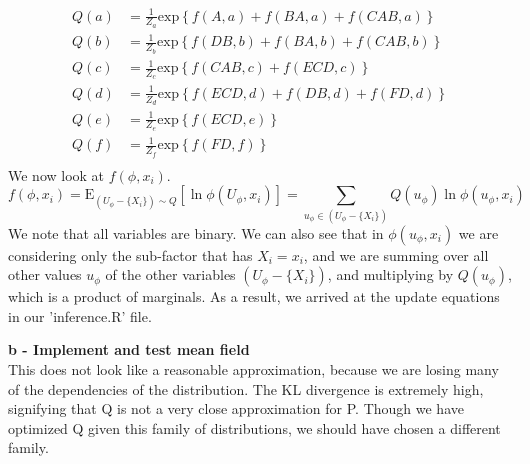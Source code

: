\documentclass[12pt]{article}
\begin{document}
\begin{align*}
Q(a) &= \frac{1}{Z_a} \mathrm{exp} \left\lbrace f(A,a) + f(BA,a) + f(CAB,a) \right\rbrace \\
Q(b) &= \frac{1}{Z_b} \mathrm{exp} \left\lbrace f(DB,b) + f(BA,b) + f(CAB,b) \right\rbrace \\
Q(c) &= \frac{1}{Z_c} \mathrm{exp} \left\lbrace f(CAB,c) + f(ECD,c) \right\rbrace \\
Q(d) &= \frac{1}{Z_d} \mathrm{exp} \left\lbrace f(ECD,d) + f(DB,d) + f(FD,d) \right\rbrace \\
Q(e) &= \frac{1}{Z_e} \mathrm{exp} \left\lbrace f(ECD,e) \right\rbrace \\
Q(f) &= \frac{1}{Z_f} \mathrm{exp} \left\lbrace f(FD,f) \right\rbrace \\
\end{align*}
We now look at $f(\phi, x_i)$.
\[
f(\phi, x_i) = \mathrm{E}_{(U_\phi - \lbrace X_i \rbrace) \sim Q} [\ln \phi(U_\phi , x_i)] = \sum_{u_\phi \in (U_\phi - \lbrace X_i \rbrace)} Q(u_\phi) \ln \phi(u_\phi, x_i)
\]
We note that all variables are binary.  We can also see that in $\phi(u_\phi, x_i)$ we are considering only the sub-factor that has $X_i = x_i$, and we are summing over all other values $u_\phi$ of the other variables $(U_\phi - \lbrace X_i \rbrace)$, and multiplying by $Q(u_\phi)$, which is a product of marginals.  As a result, we arrived at the update equations in our 'inference.R' file.

\noindent \textbf{b - Implement and test mean field}\\
This does not look like a reasonable approximation, because we are losing many of the dependencies of the distribution.  The KL divergence is extremely high, signifying that Q is not a very close approximation for P.  Though we have optimized Q given this family of distributions, we should have chosen a different family.\\
\end{document}
